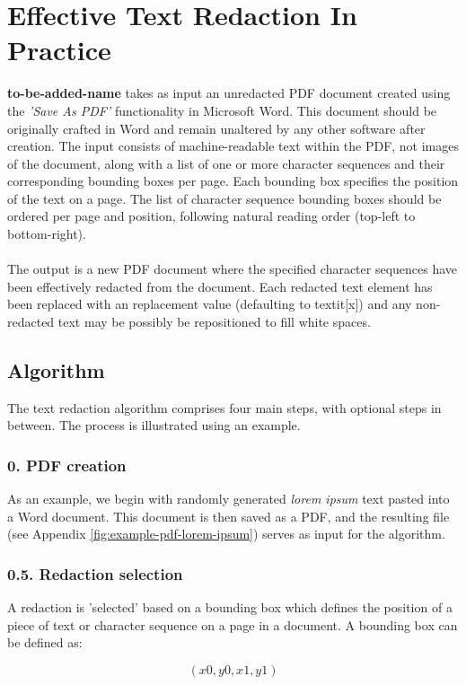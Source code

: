 \section{Effective Text Redaction In Practice}
\textbf{to-be-added-name} takes as input an unredacted PDF document created using the \textit{'Save As PDF'} functionality in Microsoft Word. This document should be originally crafted in Word and remain unaltered by any other software after creation. The input consists of machine-readable text within the PDF, not images of the document, along with a list of one or more character sequences and their corresponding bounding boxes per page. Each bounding box specifies the position of the text on a page. The list of character sequence bounding boxes should be ordered per page and position, following natural reading order (top-left to bottom-right).
\\\\
The output is a new PDF document where the specified character sequences have been effectively redacted from the document. Each redacted text element has been replaced with an replacement value (defaulting to textit{[x]}) and any non-redacted text may be possibly be repositioned to fill white spaces. 


\subsection{Algorithm}
The text redaction algorithm comprises four main steps, with optional steps in between. The process is illustrated using an example.

\subsubsection{0. PDF creation}
As an example, we begin with randomly generated \textit{lorem ipsum} text pasted into a Word document. This document is then saved as a PDF, and the resulting file (see Appendix \ref{fig:example-pdf-lorem-ipsum}) serves as input for the algorithm.

\subsubsection{0.5. Redaction selection}
A redaction is 'selected' based on a bounding box which defines the position of a piece of text or character sequence on a page in a document. A bounding box can be defined as:

\[ (x0, y0, x1, y1) \]


